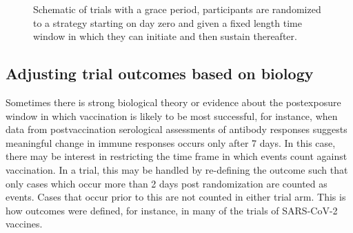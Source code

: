 \begin{appendix}
\begin{figure}[p]
            \caption{Schematic of trials with a grace period, participants are randomized to a strategy starting on day zero and given a fixed length time window in which they can initiate and then sustain thereafter.}
            \label{fig:design3}
    \end{figure}

    \clearpage

    \subsection{Adjusting trial outcomes based on biology} \label{sec:delayed_followup}
    Sometimes there is strong biological theory or evidence about the postexposure window in which vaccination is likely to be most successful, for instance, when data from postvaccination serological assessments of antibody responses suggests meaningful change in immune responses occurs only after 7 days. In this case, there may be interest in restricting the time frame in which events count against vaccination. In a trial, this may be handled by re-defining the outcome such that only cases which occur more than 2 days post randomization are counted as events. Cases that occur prior to this are not counted in either trial arm. This is how outcomes were defined, for instance, in many of the trials of SARS-CoV-2 vaccines. 
        

\end{appendix}
